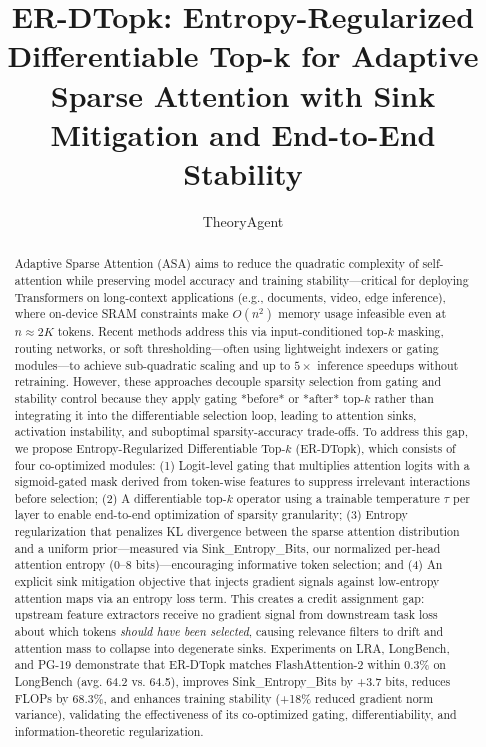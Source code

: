 \documentclass{article}
\title{ER-DTopk: Entropy-Regularized Differentiable Top-k for Adaptive Sparse Attention with Sink Mitigation and End-to-End Stability}
\author{TheoryAgent}
\begin{document}
\maketitle

\begin{abstract}
\begin{abstract}
Adaptive Sparse Attention (ASA) aims to reduce the quadratic complexity of self-attention while preserving model accuracy and training stability---critical for deploying Transformers on long-context applications (e.g., documents, video, edge inference), where on-device SRAM constraints make $O(n^2)$ memory usage infeasible even at $n \approx 2K$ tokens. Recent methods address this via input-conditioned top-$k$ masking, routing networks, or soft thresholding---often using lightweight indexers or gating modules---to achieve sub-quadratic scaling and up to $5\times$ inference speedups without retraining. However, these approaches decouple sparsity selection from gating and stability control because they apply gating *before* or *after* top-$k$ rather than integrating it into the differentiable selection loop, leading to attention sinks, activation instability, and suboptimal sparsity-accuracy trade-offs. To address this gap, we propose Entropy-Regularized Differentiable Top-$k$ (ER-DTopk), which consists of four co-optimized modules: (1) Logit-level gating that multiplies attention logits with a sigmoid-gated mask derived from token-wise features to suppress irrelevant interactions before selection; (2) A differentiable top-$k$ operator using a trainable temperature $\tau$ per layer to enable end-to-end optimization of sparsity granularity; (3) Entropy regularization that penalizes KL divergence between the sparse attention distribution and a uniform prior---measured via Sink\_Entropy\_Bits, our normalized per-head attention entropy (0--8 bits)---encouraging informative token selection; and (4) An explicit sink mitigation objective that injects gradient signals against low-entropy attention maps via an entropy loss term. This creates a credit assignment gap: upstream feature extractors receive no gradient signal from downstream task loss about which tokens \emph{should have been selected}, causing relevance filters to drift and attention mass to collapse into degenerate sinks. Experiments on LRA, LongBench, and PG-19 demonstrate that ER-DTopk matches FlashAttention-2 within 0.3\% on LongBench (avg. 64.2 vs. 64.5), improves Sink\_Entropy\_Bits by +3.7 bits, reduces FLOPs by 68.3\%, and enhances training stability (+18\% reduced gradient norm variance), validating the effectiveness of its co-optimized gating, differentiability, and information-theoretic regularization.
\end{abstract}
\end{abstract}
\end{document}
